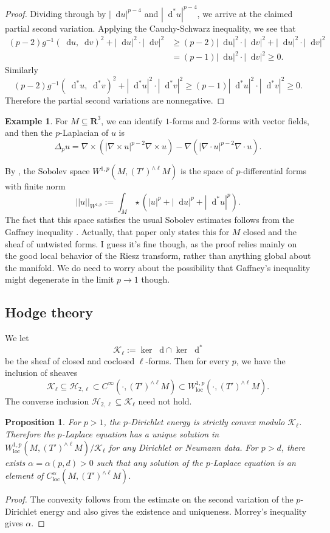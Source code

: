 \documentclass[reqno,12pt]{amsart}
\newcommand{\RR}{\mathbf{R}}
\newcommand*\dif{\mathop{}\!\mathrm{d}}
\newcommand{\loc}{\mathrm{loc}}
\newtheorem{proposition}[theorem]{Proposition}
\theoremstyle{definition}
\newtheorem{example}[theorem]{Example}
\numberwithin{equation}{section}
\begin{document}
\begin{proof}
Dividing through by $|\dif u|^{p - 4}$ and $|\dif^* u|^{p - 4}$, we arrive at the claimed partial second variation.
Applying the Cauchy-Schwarz inequality, we see that 
\begin{align*}
(p - 2) g^{-1}(\dif u, \dif v)^2 + |\dif u|^2 \cdot |\dif v|^2 &\geq (p - 2) |\dif u|^2 \cdot |\dif v|^2 + |\dif u|^2 \cdot |\dif v|^2 \\
&= (p - 1) |\dif u|^2 \cdot |\dif v|^2 \geq 0.
\end{align*}
Similarly
$$(p - 2) g^{-1}(\dif^* u, \dif^* v)^2 + |\dif^* u|^2 \cdot |\dif^* v|^2 \geq (p - 1) |\dif^* u|^2 \cdot |\dif^* v|^2 \geq 0.$$
Therefore the partial second variations are nonnegative.
\end{proof}

\begin{example}
For $M \subseteq \RR^3$, we can identify $1$-forms and $2$-forms with vector fields, and then the $p$-Laplacian of $u$ is 
$$\Delta_p u = \nabla \times (|\nabla \times u|^{p - 2} \nabla \times u) - \nabla(|\nabla \cdot u|^{p - 2} \nabla \cdot u).$$
\end{example}

By \cite[\S3]{Scott95}, the Sobolev space $W^{1, p}(M, (T')^{\wedge \ell} M)$ is the space of $p$-differential forms with finite norm 
$$||u||_{W^{1, p}} := \int_M \star(|u|^p + |\dif u|^p + |\dif^* u|^p).$$
The fact that this space satisfies the usual Sobolev estimates follows from the Gaffney inequality \cite[Proposition 4.3]{Scott95}.
Actually, that paper only states this for $M$ closed and the sheaf of untwisted forms.
I guess it's fine though, as the proof relies mainly on the good local behavior of the Riesz transform, rather than anything global about the manifold.
We do need to worry about the possibility that Gaffney's inequality might degenerate in the limit $p \to 1$ though.

\subsection{Hodge theory}
We let
$$\mathscr K_\ell := \ker \dif \cap \ker \dif^*$$
be the sheaf of closed and coclosed $\ell$-forms.
Then for every $p$, we have the inclusion of sheaves
$$\mathscr K_\ell \subseteq \mathscr H_{2, \ell} \subset C^\infty(\cdot, (T')^{\wedge \ell} M) \subset W^{1, p}_\loc(\cdot, (T')^{\wedge \ell} M).$$
The converse inclusion $\mathscr H_{2, \ell} \subseteq \mathscr K_\ell$ need not hold.

\begin{proposition}
For $p > 1$, the $p$-Dirichlet energy is strictly convex modulo $\mathscr K_\ell$.
Therefore the $p$-Laplace equation has a unique solution in $W^{1, p}_\loc(M, (T')^{\wedge \ell} M)/\mathscr K_\ell$ for any Dirichlet or Neumann data.
For $p > d$, there exists $\alpha = \alpha(p, d) > 0$ such that any solution of the $p$-Laplace equation is an element of $C^\alpha_\loc(M, (T')^{\wedge \ell} M)$.
\end{proposition}
\begin{proof}
The convexity follows from the estimate on the second variation of the $p$-Dirichlet energy and also gives the existence and uniqueness.
Morrey's inequality gives $\alpha$.
\end{proof}
\end{document}
